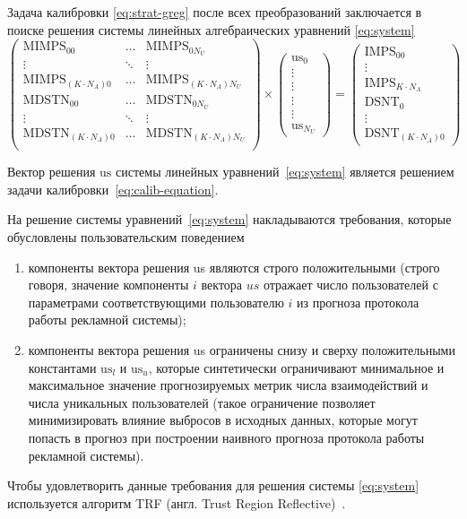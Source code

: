 Задача калибровки \eqref{eq:strat-greg} после всех преобразований заключается в поиске решения системы линейных
алгебраических уравнений \eqref{eq:system}
\begin{equation}
    \left(
        \begin{array}{ccc}
            \text{MIMPS}_{00} & \dots & \text{MIMPS}_{0N_U} \\
            \vdots & \ddots & \vdots \\
            \text{MIMPS}_{(K\cdot N_A)0} & \dots & \text{MIMPS}_{(K\cdot N_A)N_U} \\
            \text{MDSTN}_{00} & \dots & \text{MDSTN}_{0N_U} \\
            \vdots & \ddots & \vdots \\
            \text{MDSTN}_{(K\cdot N_A)0} & \dots & \text{MDSTN}_{(K\cdot N_A)N_U} \\
        \end{array}
    \right)\times
    \left(
        \begin{array}{c}
            \text{us}_{0} \\
            \vdots \\
            \vdots \\
            \vdots \\
            \vdots \\
            \text{us}_{N_U}
        \end{array}
    \right) = 
    \left(
        \begin{array}{c}
            \text{IMPS}_{00} \\
            \vdots \\
            \text{IMPS}_{K\cdot N_A} \\
            \text{DSNT}_{0} \\
            \vdots \\
            \text{DSNT}_{(K\cdot N_A)0}
        \end{array}
    \right)
    \label{eq:system}
\end{equation}

Вектор решения $\text{us}$ системы линейных уравнений~\eqref{eq:system} является решением задачи 
калибровки~\eqref{eq:calib-equation}.

На решение системы уравнений~\eqref{eq:system} накладываются требования, которые обусловлены пользовательским
поведением
\begin{enumerate}
    \item компоненты вектора решения us являются строго положительными (строго говоря, значение компоненты 
    $i$ вектора $us$ отражает число пользователей с параметрами соответствующими пользователю $i$ из
    прогноза протокола работы рекламной системы);
    \item компоненты вектора решения us ограничены снизу и сверху положительными константами $\text{us}_l$ и 
    $\text{us}_u$, которые синтетически ограничивают минимальное и максимальное значение прогнозируемых
    метрик числа взаимодействий и числа уникальных пользователей (такое ограничение позволяет минимизировать
    влияние выбросов в исходных данных, которые могут попасть в прогноз при построении наивного прогноза
    протокола работы рекламной системы).
\end{enumerate}

Чтобы удовлетворить данные требования для решения системы \eqref{eq:system} используется алгоритм TRF 
(англ. Trust Region Reflective)~\autocite{algo:trf}.